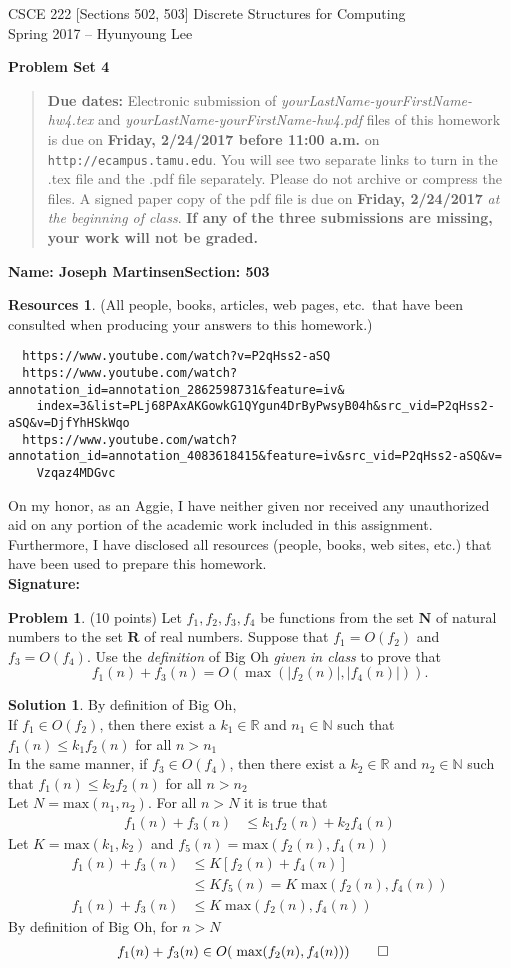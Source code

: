 \documentclass{article}
\theoremstyle{definition}
\newtheorem{problem}{Problem}
\newtheorem*{solution}{Solution}
\newtheorem*{resources}{Resources}
\newcommand{\name}[2]{\noindent\textbf{Name: #1}\hfill \textbf{Section: #2}}
\newcommand{\honor}{\noindent On my honor, as an Aggie, I have neither
  given nor received any unauthorized aid on any portion of the
  academic work included in this assignment. Furthermore, I have
  disclosed all resources (people, books, web sites, etc.) that have
  been used to prepare this homework. \\[2ex]
 \textbf{Signature:} \underline{\hspace*{10cm}} }
\newcommand{\problemset}[1]{\begin{center}\textbf{Problem Set #1}\end{center}}
\newcommand{\duedate}[2]{\begin{quote}\textbf{Due dates:} Electronic
    submission of \textsl{yourLastName-yourFirstName-hw4.tex} and 
    \textsl{yourLastName-yourFirstName-hw4.pdf} files of this homework is due on
    \textbf{#1} on \texttt{http://ecampus.tamu.edu}. You will see two separate links
    to turn in the .tex file and the .pdf file separately. Please do not archive or compress the files.  
    A signed paper copy of the pdf file is due on \textbf{#2} \textsl{at the beginning of class}.
    \textbf{If any of the three submissions are missing, your work will not be graded.}\end{quote} }
\newcommand{\N}{\mathbf{N}}
\newcommand{\R}{\mathbf{R}}
\begin{document}
\vspace*{-15mm}
\begin{center}
{\large
CSCE 222 [Sections 502, 503] Discrete Structures for Computing\\[.5ex]
Spring 2017 -- Hyunyoung Lee\\}
\end{center}
\problemset{4}
\duedate{Friday, 2/24/2017 before 11:00 a.m.}{Friday, 2/24/2017}
\name{Joseph Martinsen}{503}
\begin{resources} (All people, books, articles, web pages, etc.\ that
  have been consulted when producing your answers to this homework.) \\
  \begin{verbatim}
  https://www.youtube.com/watch?v=P2qHss2-aSQ
  https://www.youtube.com/watch?annotation_id=annotation_2862598731&feature=iv&
    index=3&list=PLj68PAxAKGowkG1QYgun4DrByPwsyB04h&src_vid=P2qHss2-aSQ&v=DjfYhHSkWqo
  https://www.youtube.com/watch?annotation_id=annotation_4083618415&feature=iv&src_vid=P2qHss2-aSQ&v=
    Vzqaz4MDGvc
    \end{verbatim}
\end{resources}
\honor

\smallskip

\begin{problem} (10 points)
Let $f_1, f_2, f_3, f_4$ be functions from the set $\N$ of natural numbers
to the set $\R$ of real numbers. Suppose that $f_1= O(f_2)$ and
$f_3=O(f_4)$. Use the \textit{definition} of Big Oh \textit{given in class} to prove that 
$$f_1(n) + f_3(n) = O(\max(|f_2(n)|,  |f_4(n)| ) ).$$
\end{problem}
\begin{solution}
By definition of Big Oh, \\
If $f_1 \in O(f_2)$, then there exist a $k_1 \in \mathbb{R}$ and $n_1 \in \mathbb{N}$ such that $f_1(n) \le k_1 f_2(n)$ for all $n>n_1$\\
In the same manner, if $f_3 \in O(f_4)$, then there exist a $k_2 \in \mathbb{R}$ and $n_2 \in \mathbb{N}$ such that $f_1(n) \le k_2 f_2(n)$ for all $n>n_2$ \\
Let $N = \text{max}(n_1,n_2)$. For all $n > N$ it is true that
\begin{align*}
  f_1(n) + f_3(n) &\le k_1 f_2(n) + k_2 f_4(n)
\end{align*}
Let $K = \text{max}(k_1,k_2)$ and $f_5(n) = \text{max}(f_2(n),f_4(n))$
\begin{align*}
  f_1(n) + f_3(n) &\le K[f_2(n) + f_4(n)] \\
  &\le K f_5(n) = K \;\text{max}(f_2(n),f_4(n)) \\
    f_1(n) + f_3(n) &\le K \;\text{max}(f_2(n),f_4(n))
\end{align*}
By definition of Big Oh, for $n > N$
\begin{align*}
  f_1(n) + f_3(n) &\in O( \;\text{max}(f_2(n),f_4(n))) \qed
\end{align*}
\end{solution}
\end{document}
